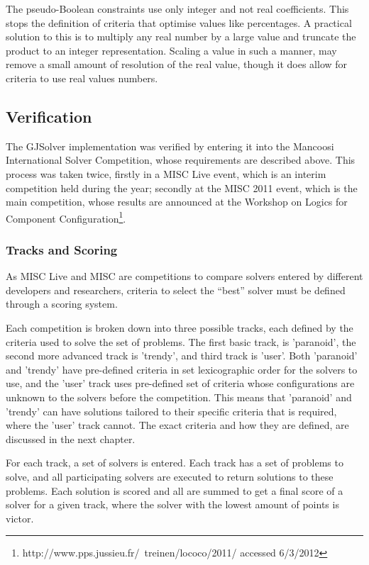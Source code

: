 The pseudo-Boolean constraints use only integer and not real coefficients.
This stops the definition of criteria that optimise values like percentages.
A practical solution to this is to multiply any real number by a large value and truncate the product to an integer representation.
Scaling a value in such a manner, may remove a small amount of resolution of the real value, though it does allow for criteria to use real values numbers.

\subsection{Verification}
\label{impl.verif}
The GJSolver implementation was verified by entering it into the Mancoosi International Solver Competition, whose requirements are described above.
This process was taken twice, firstly in a MISC Live event, which is an interim competition held during the year;
secondly at the MISC 2011 event, 
which is the main competition, whose results are announced at the Workshop on Logics for Component Configuration\footnote{http://www.pps.jussieu.fr/~treinen/lococo/2011/ accessed 6/3/2012}.

\subsubsection{Tracks and Scoring}
As MISC Live and MISC are competitions to compare solvers entered by different developers and researchers,
criteria to select the ``best'' solver must be defined through a scoring system.

Each competition is broken down into three possible tracks, each defined by the criteria used to solve the set of problems.
The first basic track, is 'paranoid', the second more advanced track is 'trendy', and third track is 'user'.
Both 'paranoid' and 'trendy' have pre-defined criteria in set lexicographic order for the solvers to use, 
and the 'user' track uses pre-defined set of criteria whose configurations are unknown to the solvers before the competition.
This means that 'paranoid' and 'trendy' can have solutions tailored to their specific criteria that is required, where the 'user' track cannot.
The exact criteria and how they are defined, are discussed in the next chapter.

For each track, a set of solvers is entered.
Each track has a set of problems to solve, and all participating solvers are executed to return solutions to these problems.
Each solution is scored and all are summed to get a final score of a solver for a given track, where the solver with the lowest amount of points is victor.

